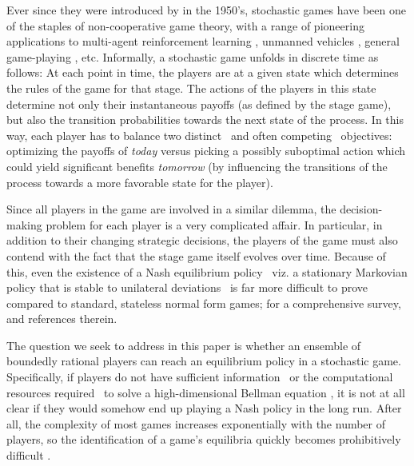 

Ever since they were introduced by \citet{Sha53} in the 1950's, stochastic games have been one of the staples of non-cooperative game theory, with a range of pioneering applications to
multi-agent reinforcement learning \cite{SLB08},
unmanned vehicles \cite{shalev2016safe},
general game-playing \cite{Silver17:Mastering,Vinyals19:Grandmaster,Mora17:DeepStack},
etc.
Informally, a stochastic game unfolds in discrete time as follows:
At each point in time, the players are at a given state which determines the rules of the game for that stage.
The actions of the players in this state determine not only their instantaneous payoffs (as defined by the stage game), but also the transition probabilities towards the next state of the process.
In this way, each player has to balance two distinct \textendash\ and often competing \textendash\ objectives:
optimizing the payoffs of \emph{today} versus picking a possibly suboptimal action which could yield significant benefits \emph{tomorrow} (\ie by influencing the transitions of the process towards a more favorable state for the player).

Since all players in the game are involved in a similar dilemma, the decision-making problem for each player is a very complicated affair.
In particular, in addition to their changing strategic decisions, the players of the game must also contend with the fact that the stage game itself evolves over time.
Because of this, even the existence of a Nash equilibrium policy \textendash\ viz. a stationary Markovian policy that is stable to unilateral deviations \cite{fink1964equilibrium} \textendash\ is far more difficult to prove compared to standard, stateless normal form games;
for a comprehensive survey, \cf \cite{NS03,solan2015stochastic} and references therein.

The question we seek to address in this paper is whether an ensemble of boundedly rational players can reach an equilibrium policy in a stochastic game.
Specifically, if players do not have sufficient information \textendash\ or the computational resources required \textendash\ to solve a high-dimensional Bellman equation \cite{FilVri97,SB98}, it is not at all clear if they would somehow end up playing a Nash policy in the long run.
After all, the complexity of most games increases exponentially with the number of players, so the identification of a game's equilibria quickly becomes prohibitively difficult \cite{Yujia22:The}.


